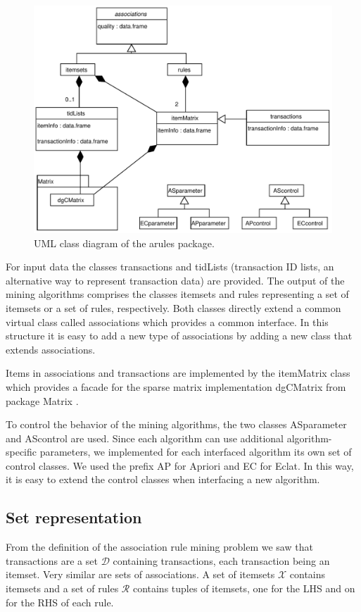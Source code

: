 \documentclass[10pt,a4paper]{article}
\newcommand{\strong}[1]{{\normalfont\fontseries{b}\selectfont #1}}
\newcommand{\class}[1]{\textsf{#1}}
\newcommand{\pkg}[1]{\strong{#1}}
\newcommand{\set}[1]{\mathcal{#1}}
\begin{document}
\begin{figure}[tp]
\centering
\includegraphics[width=12cm]{arules-classes}
\caption{UML class diagram of the \pkg{arules}
package.\label{fig:arules-classes}}
\end{figure}

For input data the classes \class{transactions}
and \class{tidLists} (transaction ID lists, an alternative
way to represent transaction data)
are provided.
The output of the mining algorithms comprises the classes
\class{itemsets} and \class{rules} representing a set of itemsets or
a set of rules, respectively.
Both classes directly extend
a common virtual class called \class{associations} which provides a
common interface.
In this structure it is easy to add a new type of associations by adding
a new class that extends \class{associations}.

Items in \class{associations} and \class{transactions} are implemented
by the \class{itemMatrix} class which provides a facade for the sparse
matrix implementation \class{dgCMatrix} from package \pkg{Matrix}
\citep{arules:Bates+Maechler:2005}.

To control the behavior of the mining algorithms, the two classes
\class{ASparameter} and \class{AScontrol} are used.  Since each
algorithm can use additional algorithm-specific parameters, we
implemented for each interfaced algorithm its own set of control
classes.  We used the prefix \class{AP} for Apriori and \class{EC} for
Eclat.  In this way, it is easy to extend the control classes when
interfacing a new algorithm.


\subsection{Set representation\label{sec:setrepresentation}}
From the definition of the association rule mining problem we saw that
transactions are a set $\set{D}$ containing transactions, each
transaction being an itemset.
Very similar are sets of associations. A set of itemsets $\set{X}$ 
contains itemsets and a set of rules $\set{R}$ contains tuples of itemsets,
one for the LHS and on for the RHS of each rule.
\end{document}
